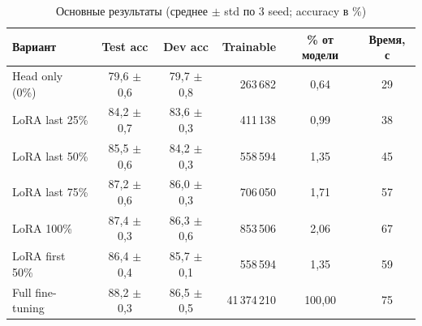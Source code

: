 \begin{table}[H]
\centering
\small
\caption{Основные результаты (среднее $\pm$ std по 3 seed; accuracy в \%)}
\label{tab:results}
\begin{tabular}{lccrcc}
\toprule
\textbf{Вариант} & \textbf{Test acc} & \textbf{Dev acc} & \textbf{Trainable} & \textbf{\% от модели} & \textbf{Время, с} \\
\midrule
Head only (0\%) & 79{,}6 $\pm$ 0{,}6 & 79{,}7 $\pm$ 0{,}8 & 263\,682 & 0{,}64 & 29 \\
LoRA last 25\% & 84{,}2 $\pm$ 0{,}7 & 83{,}6 $\pm$ 0{,}3 & 411\,138 & 0{,}99 & 38 \\
LoRA last 50\% & 85{,}5 $\pm$ 0{,}6 & 84{,}2 $\pm$ 0{,}3 & 558\,594 & 1{,}35 & 45 \\
LoRA last 75\% & 87{,}2 $\pm$ 0{,}6 & 86{,}0 $\pm$ 0{,}3 & 706\,050 & 1{,}71 & 57 \\
LoRA 100\% & 87{,}4 $\pm$ 0{,}3 & 86{,}3 $\pm$ 0{,}6 & 853\,506 & 2{,}06 & 67 \\
LoRA first 50\% & 86{,}4 $\pm$ 0{,}4 & 85{,}7 $\pm$ 0{,}1 & 558\,594 & 1{,}35 & 59 \\
Full fine-tuning & 88{,}2 $\pm$ 0{,}3 & 86{,}5 $\pm$ 0{,}5 & 41\,374\,210 & 100{,}00 & 75 \\
\bottomrule
\end{tabular}
\end{table}

